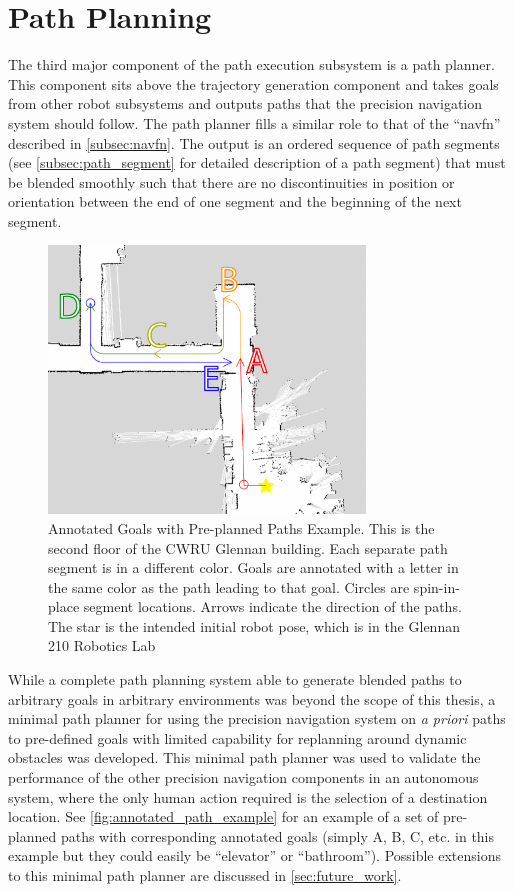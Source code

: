 \section{Path Planning}\label{sec:path_planning}

The third major component of the path execution subsystem is a path planner. This component sits above the trajectory generation component and takes goals from other robot subsystems and outputs paths that the precision navigation system should follow. The path planner fills a similar role to that of the ``navfn'' described in \autoref{subsec:navfn}. The output is an ordered sequence of path segments (see \autoref{subsec:path_segment} for detailed description of a path segment) that must be blended smoothly such that there are no discontinuities in position or orientation between the end of one segment and the beginning of the next segment.

\begin{figure}
\centering
\includegraphics[width=0.75\textwidth]{images/2nd_floor_one_door_cropped_annotated}
\caption[Annotated Goals with Pre-planned Paths Example]{Annotated Goals with Pre-planned Paths Example. This is the second floor of the CWRU Glennan building. Each separate path segment is in a different color. Goals are annotated with a letter in the same color as the path leading to that goal. Circles are spin-in-place segment locations. Arrows indicate the direction of the paths. The star is the intended initial robot pose, which is in the Glennan 210 Robotics Lab \label{fig:annotated_path_example}}
\end{figure}

While a complete path planning system able to generate blended paths to arbitrary goals in arbitrary environments was beyond the scope of this thesis, a minimal path planner for using the precision navigation system on \emph{a priori} paths to pre-defined goals with limited capability for replanning around dynamic obstacles was developed. This minimal path planner was used to validate the performance of the other precision navigation components in an autonomous system, where the only human action required is the selection of a destination location. See \autoref{fig:annotated_path_example} for an example of a set of pre-planned paths with corresponding annotated goals (simply A, B, C, etc. in this example but they could easily be ``elevator'' or ``bathroom''). Possible extensions to this minimal path planner are discussed in \autoref{sec:future_work}.

